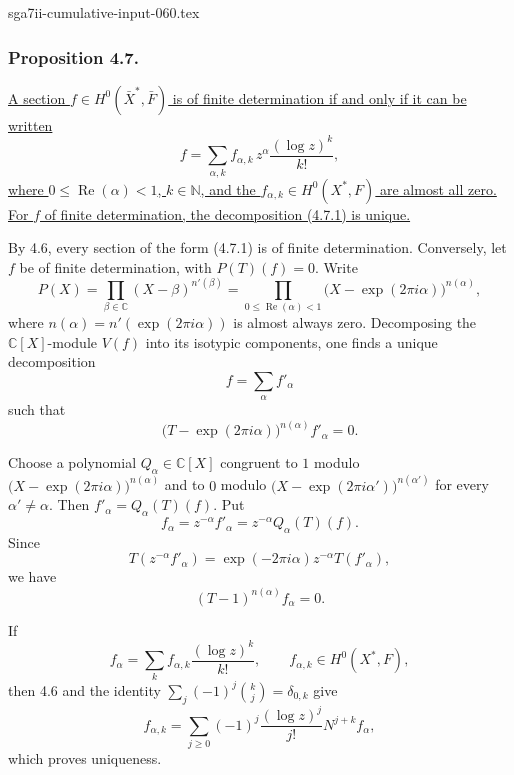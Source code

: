 \begin{filecontents*}{sga7ii-cumulative-input-060.tex}
\subsubsection*{Proposition 4.7.}
\underline{A section $f\in H^0(\bar X^*,\bar F)$ is of finite
determination if and only if it can be written}
\begin{equation}\tag{4.7.1}
f=\sum_{\alpha,k}f_{\alpha,k}\,
z^\alpha\frac{(\log z)^k}{k!},
\end{equation}
\underline{where $0\leq\operatorname{Re}(\alpha)<1$,
$k\in\mathbb N$, and the
$f_{\alpha,k}\in H^0(X^*,F)$ are almost all zero.  For $f$ of finite
determination, the decomposition (4.7.1) is unique.}

By 4.6, every section of the form (4.7.1) is of finite determination.
Conversely, let $f$ be of finite determination, with $P(T)(f)=0$.
Write
\[
P(X)=\prod_{\beta\in\mathbb C}(X-\beta)^{n'(\beta)}
=\prod_{0\leq\operatorname{Re}(\alpha)<1}
 \bigl(X-\exp(2\pi i\alpha)\bigr)^{n(\alpha)},
\]
where
$n(\alpha)=n'(\exp(2\pi i\alpha))$ is almost always zero.
Decomposing the $\mathbb C[X]$-module $V(f)$ into its isotypic
components, one finds a unique decomposition
\[
f=\sum_\alpha f'_\alpha
\]
such that
\[
\bigl(T-\exp(2\pi i\alpha)\bigr)^{n(\alpha)}f'_\alpha=0.
\]

Choose a polynomial $Q_\alpha\in\mathbb C[X]$ congruent to $1$
modulo
$\bigl(X-\exp(2\pi i\alpha)\bigr)^{n(\alpha)}$ and to $0$ modulo
$\bigl(X-\exp(2\pi i\alpha')\bigr)^{n(\alpha')}$ for every
$\alpha'\ne\alpha$.  Then
$f'_\alpha=Q_\alpha(T)(f)$.  Put
\begin{equation}\tag{4.7.2}
f_\alpha=z^{-\alpha}f'_\alpha
=z^{-\alpha}Q_\alpha(T)(f).
\end{equation}
Since
\[
T(z^{-\alpha}f'_\alpha)
=\exp(-2\pi i\alpha)z^{-\alpha}T(f'_\alpha),
\]
we have
\[
(T-1)^{n(\alpha)}f_\alpha=0.
\]

If
\[
f_\alpha=\sum_k f_{\alpha,k}\frac{(\log z)^k}{k!},
\qquad f_{\alpha,k}\in H^0(X^*,F),
\]
then 4.6 and the identity
$\sum_j(-1)^j\binom{k}{j}=\delta_{0,k}$ give
\begin{equation}\tag{4.7.3}
f_{\alpha,k}
=\sum_{j\geq0}(-1)^j\frac{(\log z)^j}{j!}
  N^{j+k}f_\alpha,
\end{equation}
which proves uniqueness.


\end{filecontents*}
